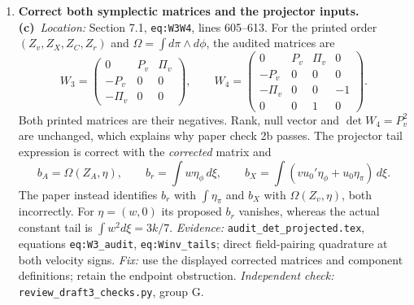 \documentclass[11pt,a4paper]{article}
\newcommand{\C}{\textbf{(c)}\ }
\newcommand{\D}{\textbf{(d)}\ }
\newcommand{\file}[1]{\nolinkurl{#1}}
\newcommand{\test}[1]{\textit{Independent check:} \file{review_draft3_checks.py}, group #1.}
\begin{document}
\begin{enumerate}[label=\textbf{R\arabic*.},leftmargin=*,itemsep=1.2em]
\C The nonzero $3\times3$ minor only excludes Schmidt rank at most two;
it does not by itself prove infinite rank or restrict every admissible
physical phase to a bilinear. Infinite rank of this particular rational
function can instead be proved by its distinct moving poles at $y_1=-y_2$.
The evenness in $r$ and poles at $r=\pm i$ are algebraic facts.
\D Universal physical parity, a pole-free complex domain for the unknown
quantum frame, and restriction of every frame correction to the specified
one-body bilinear have not been established by those algebraic facts.
The later directional residual even contains an additive $\pi$; its physical
normalisation is explicitly open.

\textit{Fix:} retain (c) for the counterexample to reciprocity alone and for
uniqueness of the \emph{specified} Toda solution conditional on the corrected
edge equation. Restrict the Schmidt statement to the stated finite-rank
frame ansatz. Withdraw the blanket three-constraint physical exclusion and
the inference that only a rank-two continuum operator problem remains.
Keep the general continuum quantum map and physical phase (d).

\item \textbf{Correct both symplectic matrices and the projector inputs.}
\C \textit{Location:} Section 7.1, \file{eq:W3W4}, lines 605--613.
For the printed order $(Z_v,Z_X,Z_C,Z_r)$ and
$\Omega=\int d\pi\wedge d\phi$, the audited matrices are
\[
 W_3=\begin{pmatrix}0&P_v&\Pi_v\\-P_v&0&0\\-\Pi_v&0&0\end{pmatrix},\qquad
 W_4=\begin{pmatrix}0&P_v&\Pi_v&0\\-P_v&0&0&0\\-\Pi_v&0&0&-1\\0&0&1&0\end{pmatrix}.
\]
Both printed matrices are their negatives. Rank, null vector and
$\det W_4=P_v^2$ are unchanged, which explains why paper check 2b passes.
The projector tail expression is correct with the \emph{corrected} matrix
and
\[
 b_A=\Omega(Z_A,\eta),\qquad
 b_r=\int w\eta_\phi\,d\xi,\qquad
 b_X=\int(vu_0'\eta_\phi+u_0\eta_\pi)\,d\xi.
\]
The paper instead identifies $b_r$ with $\int\eta_\pi$ and $b_X$ with
$\Omega(Z_v,\eta)$, both incorrectly. For $\eta=(w,0)$ its proposed $b_r$
vanishes, whereas the actual constant tail is $\int w^2d\xi=3k/7$.
\textit{Evidence:} \file{audit_det_projected.tex}, equations
\file{eq:W3_audit}, \file{eq:Winv_tails}; direct field-pairing quadrature
at both velocity signs. \textit{Fix:} use the displayed corrected matrices
and component definitions; retain the endpoint obstruction. \test{G}


\end{enumerate}
\end{document}
